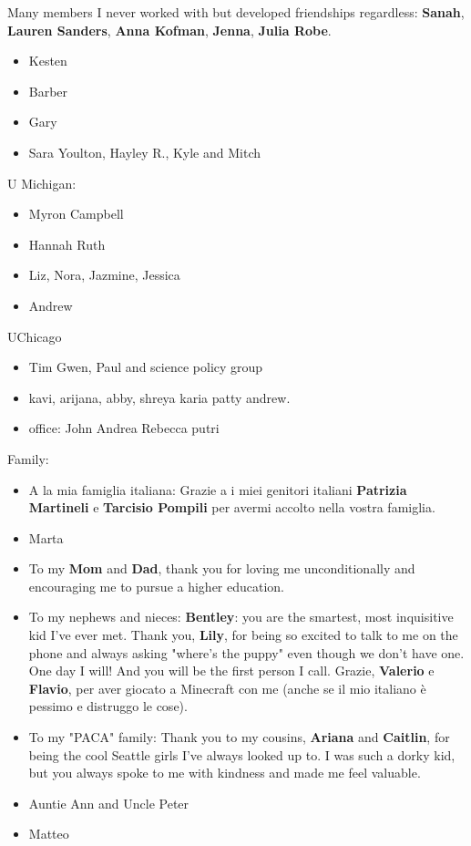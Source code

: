 \documentclass{ucetd}
\begin{document}
Many members I never worked with but developed friendships regardless: \textbf{Sanah}, \textbf{Lauren Sanders}, \textbf{Anna Kofman}, \textbf{Jenna}, \textbf{Julia Robe}.  

\begin{itemize}
        \item Kesten
        \item Barber
        \item Gary
        \item Sara Youlton, Hayley R., Kyle and Mitch
\end{itemize}
U Michigan: \begin{itemize}
        \item Myron Campbell
        \item Hannah Ruth
        \item Liz, Nora, Jazmine, Jessica
        \item Andrew
    \end{itemize}
    
UChicago\begin{itemize}
        \item Tim Gwen, Paul and science policy group
        \item kavi, arijana, abby, shreya karia patty andrew.
        \item office: John Andrea Rebecca putri 
    \end{itemize}
Family: \begin{itemize}
        \item A la mia famiglia italiana: Grazie a i miei genitori italiani \textbf{Patrizia Martineli} e \textbf{Tarcisio Pompili} per avermi accolto nella vostra famiglia.
        \item Marta
        \item To my \textbf{Mom} and \textbf{Dad}, thank you for loving me unconditionally and encouraging me to pursue a higher education.
        \item To my nephews and nieces: \textbf{Bentley}: you are the smartest, most inquisitive kid I've ever met.  Thank you, \textbf{Lily}, for being so excited to talk to me on the phone and always asking "where's the puppy" even though we don't have one.  One day I will! And you will be the first person I call.  Grazie, \textbf{Valerio} e \textbf{Flavio}, per aver giocato a Minecraft con me (anche se il mio italiano è pessimo e distruggo le cose).
        \item To my "PACA" family: Thank you to my cousins, \textbf{Ariana} and \textbf{Caitlin}, for being the cool Seattle girls I've always looked up to.  I was such a dorky kid, but you always spoke to me with kindness and made me feel valuable.
        \item Auntie Ann and Uncle Peter
        \item Matteo
    \end{itemize}
\end{document}
